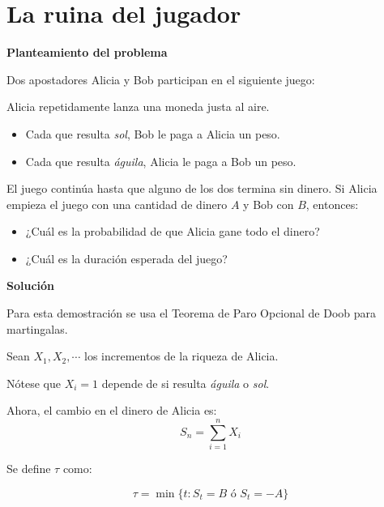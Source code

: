 \chapter{La ruina del jugador}\label{chap:ruina}


\textbf{Planteamiento del problema}
 
Dos apostadores Alicia y Bob participan en el siguiente juego:

Alicia repetidamente lanza una moneda justa al aire. 
\begin{itemize}

	\item Cada que resulta \emph{sol}, Bob le paga a Alicia un peso.

	\item Cada que resulta \emph{águila}, Alicia le paga a Bob un peso.

\end{itemize}

El juego continúa hasta que alguno de los dos termina sin dinero.
Si Alicia empieza el juego con una cantidad de dinero $A$ y Bob con $B$, entonces:
\begin{itemize}

	\item ¿Cuál es la probabilidad de que Alicia gane todo el dinero?

	\item ¿Cuál es la duración esperada del juego?

\end{itemize}

\textbf{Solución}

Para esta demostración se usa el Teorema de Paro Opcional de Doob para martingalas.

Sean $X_1,X_2,\cdots$ los incrementos de la riqueza de Alicia. 

Nótese que $X_i= 1$ depende de si resulta \emph{águila} o \emph{sol}.

Ahora, el cambio en el dinero de Alicia es:
\[S_n = \sum_{i=1}^n X_i\]

Se define $\tau$ como:

\[\tau = \min\{t: S_t = B \mbox{ ó } S_t = -A \}\]

